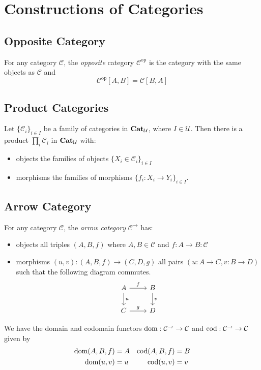 \chapter{Constructions of Categories}

\section{Opposite Category}

\begin{df}
    For any category $\mathcal{C}$, the \emph{opposite} category $\mathcal{C}^\mathrm{op}$ is the category with the same objects as $\mathcal{C}$ and
    \[ \mathcal{C}^\mathrm{op}[A,B] = \mathcal{C}[B,A] \]
\end{df}

\section{Product Categories}

\begin{thm}
Let $\{ \mathcal{C}_i \}_{i \in I}$ be a family of categories in $\mathbf{Cat}_{\mathcal{U}}$, where $I \in \mathcal{U}$. Then there is a product $\prod_i \mathcal{C}_i$ in $\mathbf{Cat}_{\mathcal{U}}$ with:
\begin{itemize}
\item objects the families of objects $\{ X_i \in \mathcal{C}_i \}_{i \in I}$
\item morphisms the families of morphisms $\{ f_i : X_i \rightarrow Y_i \}_{i \in I}$.
\end{itemize}
\end{thm}


\section{Arrow Category}

\begin{df}
For any category $\mathcal{C}$, the \emph{arrow category} $\mathcal{C}^\rightarrow$ has:
\begin{itemize}
\item objects all triples $(A,B,f)$ where $A,B \in \mathcal{C}$ and $f : A \rightarrow B : \mathcal{C}$
\item morphisms $(u,v) : (A,B,f) \rightarrow (C,D,g)$ all pairs $(u : A \rightarrow C, v : B \rightarrow D)$ such that the following diagram commutes.
\[ \begin{tikzcd}
A \arrow[r,"f"] \arrow[d,"u"] & B \arrow[d,"v"] \\
C \arrow[r,"g"] & D
\end{tikzcd} \]
\end{itemize}

We have the domain and codomain functors $\operatorname{dom} : \mathcal{C}^\rightarrow \rightarrow \mathcal{C}$ and $\operatorname{cod} : \mathcal{C}^\rightarrow \rightarrow \mathcal{C}$ given by
\begin{align*}
\operatorname{dom} (A,B,f) & = A & \operatorname{cod} (A,B,f) & = B \\
\operatorname{dom}(u,v) & = u & \operatorname{cod} (u,v) & = v
\end{align*}
\end{df}

